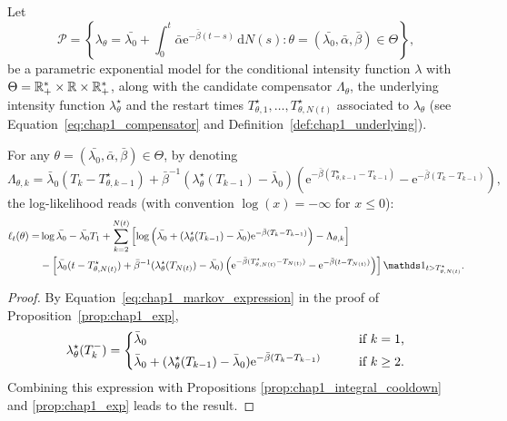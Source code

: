 \begin{corollary}
  Let
  \begin{equation}
    \mathcal P = \left\{ \lambda_\theta = \bar{\lambda_0} + \int_{0}^{t}{\bar \alpha \mathrm{e}^{-\bar \beta(t-s)}\,\mathrm{d}N(s)} : \theta=(\bar{\lambda_0}, \bar \alpha, \bar \beta) \in \Theta \right\},
    \label{eq:chap1_model}
  \end{equation}
  be a parametric exponential model for the conditional intensity function $\lambda$ with $\Theta = {\mathbb R}_+^* \times {\mathbb R} \times {\mathbb R}_+^*$,
  along with the candidate compensator $\Lambda_\theta$, the underlying intensity function $\lambda_\theta^\star$ and the restart times $T_{\theta, 1}^\star,\ldots, T_{\theta, N(t)}^\star$ associated to $\lambda_\theta$ (see Equation~\eqref{eq:chap1_compensator} and Definition~\ref{def:chap1_underlying}). %

  For any $\theta=(\bar{\lambda_0}, \bar \alpha, \bar \beta) \in \Theta$, by denoting
  \[
    \Lambda_{\theta, k} =
    \bar \lambda_0(T_k - T_{\theta, k-1}^\star) + \bar \beta^{-1} (\lambda_\theta^\star(T_{k-1}) - \bar \lambda_0) (\mathrm{e}^{-\bar \beta(T_{\theta, k-1}^\star-T_{k-1})}-\mathrm{e}^{-\bar \beta(T_k-T_{k-1})}),
  \]
  the log-likelihood reads (with convention $\log(x) = -\infty$ for $x \leq 0$):
  \begin{align}
      \ell_t(\theta)
      =& \log{\bar{\lambda_0}}
      - \bar{\lambda_0} T_1
      + \sum_{k=2}^{N(t)} \left[ \log \left(\bar{\lambda_0} + (\lambda_\theta^\star(T_{k-1}) - \bar{\lambda_0}) \mathrm{e}^{-\bar \beta(T_{k}-T_{k-1})} \right) - \Lambda_{\theta, k} \right] \notag\\
      &- \left[ \bar{\lambda_0} (t - T_{\theta, N(t)}^\star) + \bar \beta^{-1} (\lambda_\theta^\star(T_{N(t)}) - \bar{\lambda_0}) \left(\mathrm{e}^{-\bar \beta(T_{\theta, N(t)}^\star-T_{N(t)})}-\mathrm{e}^{-\bar \beta(t-T_{N(t)})} \right) \right] \II_{t > T_{\theta, N(t)}^\star}
      \label{eq:chap1_likeli_exp}.
  \end{align}
  \label{cor:chap1_loglik}
\end{corollary}
\begin{proof}
  By Equation~\eqref{eq:chap1_markov_expression} in the proof of Proposition~\ref{prop:chap1_exp},
  \begin{equation*}
  \lambda_\theta^\star(T_k^-) =
  \begin{dcases}
      \bar \lambda_0 &\text{\qquad if $k = 1$,}\\
      \bar \lambda_0 + (\lambda_\theta^\star(T_{k-1}) - \bar \lambda_0) \mathrm{e}^{-\bar \beta(T_{k}-T_{k-1})} &\text{\qquad if $k\geq2$.}
  \end{dcases}
\end{equation*}
Combining this expression with Propositions \ref{prop:chap1_integral_cooldown} and \ref{prop:chap1_exp} leads to the result.
\end{proof}

